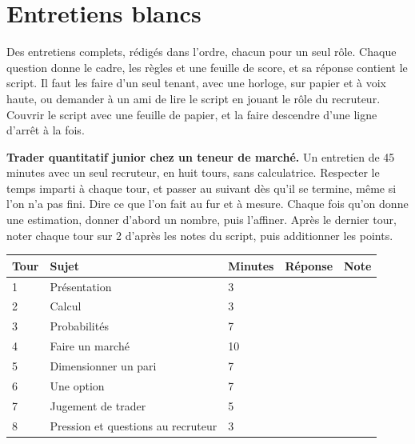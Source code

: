 \chapter{Entretiens blancs}\label{ch:iv2:mock-interviews}

\begin{ivtrains}
Des entretiens complets, rédigés dans l'ordre, chacun pour un seul rôle. Chaque question donne le cadre, les règles et une feuille de score, et sa réponse contient le script. Il faut les faire d'un seul tenant, avec une horloge, sur papier et à voix haute, ou demander à un ami de lire le script en jouant le rôle du recruteur. Couvrir le script avec une feuille de papier, et la faire descendre d'une ligne d'arrêt à la fois.
\end{ivtrains}

\begin{question}\label{iq:iv2:mock-interviews:1}
\textbf{Trader quantitatif junior chez un teneur de marché.} Un entretien de 45 minutes avec un seul recruteur, en huit tours, sans calculatrice. Respecter le temps imparti à chaque tour, et passer au suivant dès qu'il se termine, même si l'on n'a pas fini. Dire ce que l'on fait au fur et à mesure. Chaque fois qu'on donne une estimation, donner d'abord un nombre, puis l'affiner. Après le dernier tour, noter chaque tour sur 2 d'après les notes du script, puis additionner les points.

\medskip
\begin{tabular}{@{}l|l|l|l|l@{}}
Tour & Sujet & Minutes & Réponse & Note \\ \hline
1 & Présentation & 3 & & \\[6pt]\hline
2 & Calcul & 3 & & \\[6pt]\hline
3 & Probabilités & 7 & & \\[6pt]\hline
4 & Faire un marché & 10 & & \\[6pt]\hline
5 & Dimensionner un pari & 7 & & \\[6pt]\hline
6 & Une option & 7 & & \\[6pt]\hline
7 & Jugement de trader & 5 & & \\[6pt]\hline
8 & Pression et questions au recruteur & 3 & & \\[6pt]\hline
\end{tabular}
\end{question}
\vfill\clearpage
